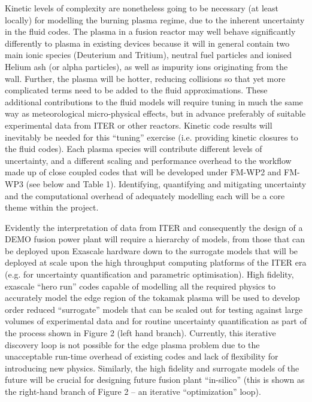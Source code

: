 \documentclass[a4paper]{article}
\begin{document}
Kinetic levels of complexity are nonetheless going to be necessary (at least 
locally) for modelling the burning plasma
regime, due to the inherent uncertainty in the fluid codes. The plasma in a 
fusion reactor may well behave
significantly differently to plasma in existing devices because it will in 
general contain two main ionic species
(Deuterium and Tritium), neutral fuel particles and ionised Helium ash (or 
alpha particles), as well as impurity ions
originating from the wall. Further, the plasma will be hotter, reducing 
collisions so that yet more complicated terms
need to be added to the fluid approximations. These additional contributions to 
the fluid models will require tuning in
much the same way as meteorological micro-physical effects, but in advance 
preferably of suitable experimental data
from ITER or other reactors. Kinetic code results will inevitably be needed for 
this ``tuning'' exercise (i.e.
providing kinetic closures to the fluid codes). Each plasma species will 
contribute different levels of uncertainty,
and a different scaling and performance overhead to the workflow made up of 
close coupled codes that will be developed
under FM-WP2 and FM-WP3 (see below and Table 1). Identifying, quantifying and 
mitigating uncertainty and the
computational overhead of adequately modelling each will be a core theme within 
the project.


\bigskip

Evidently the interpretation of data from ITER and consequently the design of a 
DEMO fusion power plant will require a
hierarchy of models, from those that can be deployed upon Exascale hardware 
down to the surrogate models that will be
deployed at scale upon the high throughput computing platforms of the ITER era 
(e.g. for uncertainty quantification and
parametric optimisation). High fidelity, exascale ``hero run'' codes capable of 
modelling all the required physics to
accurately model the edge region of the tokamak plasma will be used to develop 
order reduced ``surrogate'' models that
can be scaled out for testing against large volumes of experimental data and 
for routine uncertainty quantification as
part of the process shown in Figure 2 (left hand branch). Currently, this 
iterative discovery loop is not possible for
the edge plasma problem due to the unacceptable run-time overhead of existing 
codes and lack of flexibility for
introducing new physics. Similarly, the high fidelity and surrogate models of 
the future will be crucial for designing
future fusion plant ``in-silico'' (this is shown as the right-hand branch of 
Figure 2 -- an iterative ``optimization''
loop). 
\end{document}
